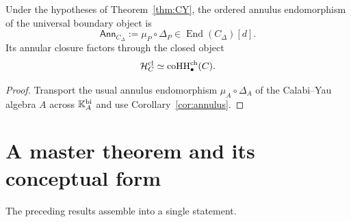 \begin{corollary}
\label{cor:cardy}
Under the hypotheses of Theorem~\ref{thm:CY}, the ordered annulus endomorphism of the universal
boundary object is
\[
\mathsf{Ann}_{C_\Delta}:=\mu_P\circ \Delta_P\in \operatorname{End}(C_\Delta)[d].
\]
Its annular closure factors through the closed object
\[
\mathcal H_C^{\mathrm{cl}}\simeq \operatorname{coHH}^{\mathrm{ch}}_\bullet(C).
\]
\end{corollary}

\begin{proof}
Transport the usual annulus endomorphism $\mu_A\circ \Delta_A$ of the Calabi--Yau algebra $A$ across
$\mathbb{K}_A^{\mathrm{bi}}$ and use Corollary~\ref{cor:annulus}.
\end{proof}

\section{A master theorem and its conceptual form}
\label{sec:master}

The preceding results assemble into a single statement.

